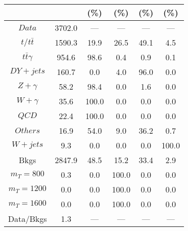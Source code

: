 \begin{figure}
\begin{minipage}[c]{0.32\textwidth}
{\begin{tabular}{cccccc}
 &  & (\%) & (\%) & (\%) & (\%)  \\
\hline
                                                                      $ Data $ &  3702.0 &  --- &  --- &  --- &  ---\\
$ t/t\bar{t} $ &  1590.3 &  19.9 &  26.5 &  49.1 &  4.5\\
$ t\bar{t}\gamma $ &  954.6 &  98.6 &  0.4 &  0.9 &  0.1\\
$ DY+jets $ &  160.7 &  0.0 &  4.0 &  96.0 &  0.0\\
$ Z+\gamma $ &  58.2 &  98.4 &  0.0 &  1.6 &  0.0\\
$ W+\gamma $ &  35.6 &  100.0 &  0.0 &  0.0 &  0.0\\
$ QCD $ &  22.4 &  100.0 &  0.0 &  0.0 &  0.0\\
$ Others $ &  16.9 &  54.0 &  9.0 &  36.2 &  0.7\\
$ W+jets $ &  9.3 &  0.0 &  0.0 &  0.0 &  100.0\\
Bkgs &  2847.9 &  48.5 &  15.2 &  33.4 &  2.9\\
$ m_{T} = 800 $ &  0.3 &  0.0 &  100.0 &  0.0 &  0.0\\
$ m_{T} = 1200 $ &  0.0 &  0.0 &  100.0 &  0.0 &  0.0\\
$ m_{T} = 1600 $ &  0.0 &  0.0 &  100.0 &  0.0 &  0.0\\
Data/Bkgs &  1.3 &  --- &  --- &  --- &  ---\\
\hline
\end{tabular}
}
\end{minipage}
\end{figure}

